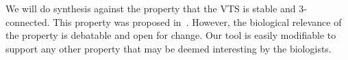 We will do synthesis against the property that the VTS
is stable and 3-connected.
%
%
This property was proposed in~\cite{shukla2017discovering}.
%
However, the biological relevance of the property is debatable and open for change.
%
Our tool is easily modifiable to support any other property that may be deemed 
interesting by the biologists.


             
